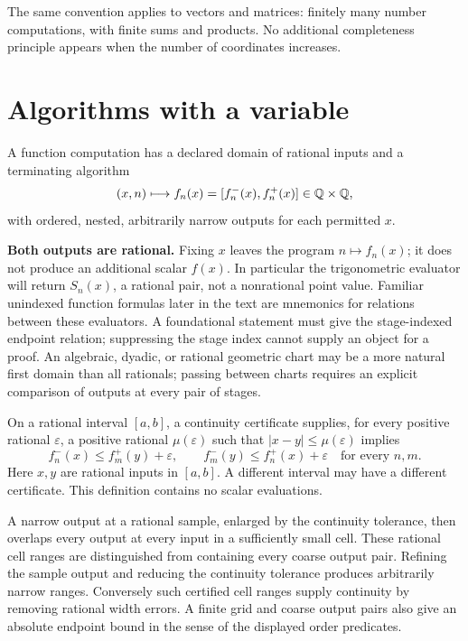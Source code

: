 The same convention applies to vectors and matrices: finitely many number
computations, with finite sums and products.  No additional completeness
principle appears when the number of coordinates increases.

\section{Algorithms with a variable}
\label{rem:parameterized-constructions}

\begin{definition}\label{def:real-fun-raw}
A function computation has a declared domain of rational inputs and a
terminating algorithm
\[
 (x,n)\longmapsto f_n(x)=[f_n^-(x),f_n^+(x)]\in\mathbb{Q}\times\mathbb{Q},
\]
with ordered, nested, arbitrarily narrow outputs for each permitted $x$.
\end{definition}

\textbf{Both outputs are rational.}  Fixing $x$ leaves the program
$n\mapsto f_n(x)$; it does not produce an additional scalar $f(x)$.
In particular the trigonometric evaluator will return $S_n(x)$, a rational
pair, not a nonrational point value.  Familiar unindexed function formulas
later in the text are mnemonics for relations between these evaluators.
A foundational statement must give the stage-indexed endpoint relation;
suppressing the stage index cannot supply an object for a proof.
An algebraic, dyadic, or rational geometric chart may be a more natural
first domain than all rationals; passing between charts requires an
explicit comparison of outputs at every pair of stages.

\begin{definition}\label{def:interval-regular}
On a rational interval $[a,b]$, a continuity certificate supplies, for every
positive rational $\varepsilon$, a positive rational $\mu(\varepsilon)$
such that $|x-y|\le\mu(\varepsilon)$ implies
\[
 f_n^-(x)\le f_m^+(y)+\varepsilon,\qquad
 f_m^-(y)\le f_n^+(x)+\varepsilon
 \quad\text{for every }n,m.
\]
Here $x,y$ are rational inputs in $[a,b]$.  A different interval may have
a different certificate.  This definition contains no scalar evaluations.
\end{definition}

A narrow output at a rational sample, enlarged by the continuity tolerance,
then overlaps every output at every input in a sufficiently small cell.
These rational cell ranges are distinguished from containing every coarse
output pair.  Refining the sample output and reducing the continuity
tolerance produces arbitrarily narrow ranges.  Conversely such certified
cell ranges supply continuity by removing rational width errors.  A finite
grid and coarse output pairs also give an absolute endpoint bound in the
sense of the displayed order predicates.

